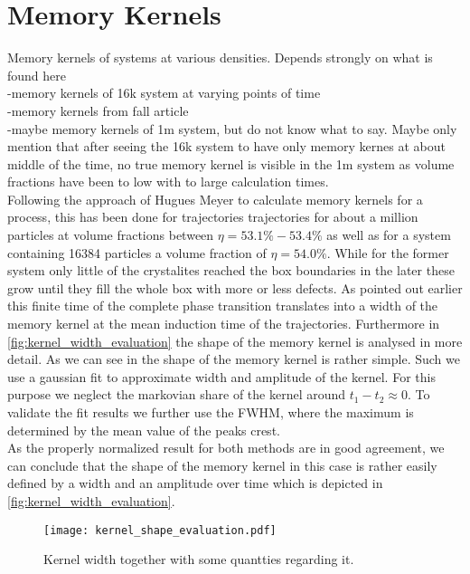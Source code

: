 \section{Memory Kernels}
\label{sec:memory_kernels}
Memory kernels of systems at various densities. Depends strongly on what is found here\\
-memory kernels of 16k system at varying points of time\\
-memory kernels from fall article\\
-maybe memory kernels of 1m system, but do not know what to say. Maybe only mention that after seeing the 16k system to have only memory kernes at about middle of the time, no true memory kernel is visible in the 1m system as volume fractions have been to low with to large calculation times.\\

 
Following the approach of Hugues Meyer to calculate memory kernels for a process, this has been done for trajectories trajectories for about a million particles at volume fractions between $\eta = 53.1\% - 53.4\%$ as well as for a system containing 16384 particles a volume fraction of $\eta = 54.0\% $. While for the former system only little of the crystalites reached the box boundaries in the later these grow until they fill the whole box with more or less defects. As pointed out earlier this finite time of the complete phase transition translates into a width of the memory kernel at the mean induction time of the trajectories. Furthermore in \autoref{fig:kernel_width_evaluation} the shape of the memory kernel is analysed in more detail. As we can see in  the shape of the memory kernel is rather simple. Such we use a gaussian fit to approximate width and amplitude of the kernel. For this purpose we neglect the markovian share of the kernel around $t_1-t_2 \approx 0$. To validate the fit results we further use the FWHM, where the maximum is determined by the mean value of the peaks crest.\\
As the properly normalized result for both methods are in good agreement, we can conclude that the shape of the memory kernel in this case is rather easily defined by a width and an amplitude over time which is depicted in \autoref{fig:kernel_width_evaluation}.


\begin{figure}[h]
\centering
\texttt{[image: kernel\_shape\_evaluation.pdf]}
\caption{Kernel width together with some quantties regarding it.}
\label{fig:kernel_width_evaluation}
\end{figure}

